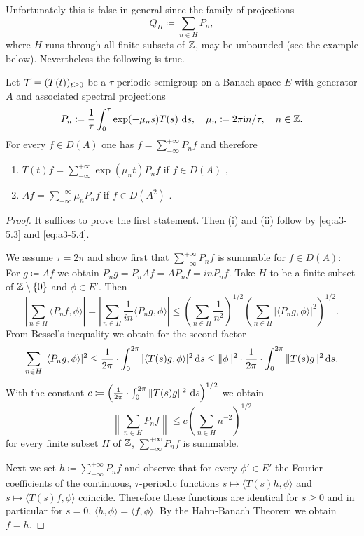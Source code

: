 Unfortunately this is false in general since the family of projections
\[
Q_{H} \coloneqq \sum_{n \in H} P_{n} ,
\]
where $H$ runs through all finite subsets of $\mathbb{Z}$, may be unbounded (see the example below).
Nevertheless the following is true.
\begin{theorem}\label{thm:a3-5.4}
Let $\mathcal{T} = (T(t))_{t \geq 0}$ be a $\tau$-periodic semigroup on a Banach space $E$ with generator $A$ and associated spectral projections
\[
P_{n} \coloneqq  \frac{1}{\tau}\int_{0}^{\tau} \exp(-\mu_{n}s)T(s) \, \mathop{}\!\mathrm{d}{s}, \quad \mu_{n} \coloneqq 2\pi\mathrm{i} n/\tau, \quad n \in \mathbb{Z}  .
\]
For every $f \in D(A)$ one has $f = \sum_{-\infty}^{+\infty} P_{n}f$ and therefore
\begin{enumerate}[\upshape (i)]
\item 
$T(t)f = \sum_{-\infty}^{+\infty} \exp(\mu_{n}t)P_{n}f$ \quad if $f \in D(A)$ ,

\item 
$Af = \sum_{-\infty}^{+\infty} \mu_{n}P_{n}f$ \quad if $f \in D(A^{2})$ .
\end{enumerate}
\end{theorem}
\begin{proof}
It suffices to prove the first statement. Then (i) and (ii) follow by \eqref{eq:a3-5.3} and \eqref{eq:a3-5.4}.

We assume $\tau = 2\pi$ and show first that $\sum_{-\infty}^{+\infty} P_{n}f$ is summable for $f \in D(A)$: For $g \coloneqq Af$ we obtain $P_{n}g = P_{n}Af = AP_{n}f = inP_{n}f$.
Take $H$ to be a finite subset of $\mathbb{Z} \setminus \{0\}$ and $\phi \in E'$. Then
\[
\left|\sum_{n \in H} \langle P_{n}f,\phi \rangle\right|
= \left|\sum_{n \in H} \frac{1}{in} \langle P_{n}g,\phi \rangle\right| 
\leq \left(\sum_{n \in H} \frac{1}{n^2}\right)^{1/2}\left(\sum_{n \in H} |\langle P_{n}g,\phi \rangle|^{2}\right)^{1/2} .
\]
From Bessel's inequality we obtain for the second factor
\[
\sum_{n \in H} |\langle P_{n}g,\phi \rangle|^{2} \leq \frac{1}{2\pi} \cdot \int_{0}^{2\pi} |\langle T(s)g,\phi \rangle|^{2}  \mathop{}\!\mathrm{d}{s} 
\leq \|\phi\|^{2} \cdot \frac{1}{2\pi} \cdot \int_{0}^{2\pi} \|T(s)g\|^{2}  \mathop{}\!\mathrm{d}{s}  .
\]
With the constant $c \coloneqq \left(\frac{1}{2\pi} \cdot \int_{0}^{2\pi} \|T(s)g\|^{2} \, \mathop{}\!\mathrm{d}{s}\right)^{1/2}$ we obtain
\[
\left\|\sum_{n \in H} P_{n}f\right\| \leq c\left(\sum_{n \in H} n^{-2}\right)^{1/2}
\]
for every finite subset $H$ of $\mathbb{Z}$, \ie $\sum_{-\infty}^{+\infty} P_{n}f$ is summable.

Next we set $h \coloneqq \sum_{-\infty}^{+\infty} P_{n}f$ and observe that for every $\phi' \in E'$ the Fourier coefficients of the continuous, $\tau$-periodic functions
$s \mapsto \langle T(s)h,\phi \rangle$ and $s \mapsto \langle T(s)f,\phi \rangle$
coincide.
Therefore these functions are identical for $s \geq 0$ and in particular for $s = 0$, \ie 
$\langle h, \phi \rangle = \langle f, \phi \rangle$.
By the Hahn-Banach Theorem we obtain $f = h$.
\end{proof}

